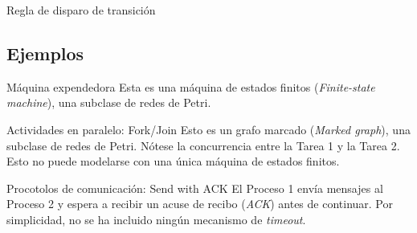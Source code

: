 \documentclass{beamer}
\begin{document}
\begin{frame}{Regla de disparo de transición}
  \begin{figure}[!htb]
    \centering
    
  \end{figure}
\end{frame}

\subsection{Ejemplos}

\begin{frame}{Máquina expendedora}
  \scriptsize
  Esta es una máquina de estados finitos (\emph{Finite-state machine}), una subclase de redes de Petri.

  \begin{figure}
    \centering
    
  \end{figure}
\end{frame}

\begin{frame}{Actividades en paralelo: Fork/Join}
  \scriptsize
  Esto es un grafo marcado (\emph{Marked graph}), una subclase de redes de Petri.
  Nótese la concurrencia entre la Tarea 1 y la Tarea 2.
  Esto no puede modelarse con una única máquina de estados finitos.

  \begin{figure}
    \centering
    
  \end{figure}
\end{frame}

\begin{frame}{Procotolos de comunicación: Send with ACK}
  \scriptsize
  El Proceso 1 envía mensajes al Proceso 2 y
  espera a recibir un acuse de recibo (\emph{ACK}) antes de continuar.
  Por simplicidad, no se ha incluido ningún mecanismo de \emph{timeout}.

  \begin{figure}
    \centering
    
  \end{figure}
\end{frame}
\end{document}
